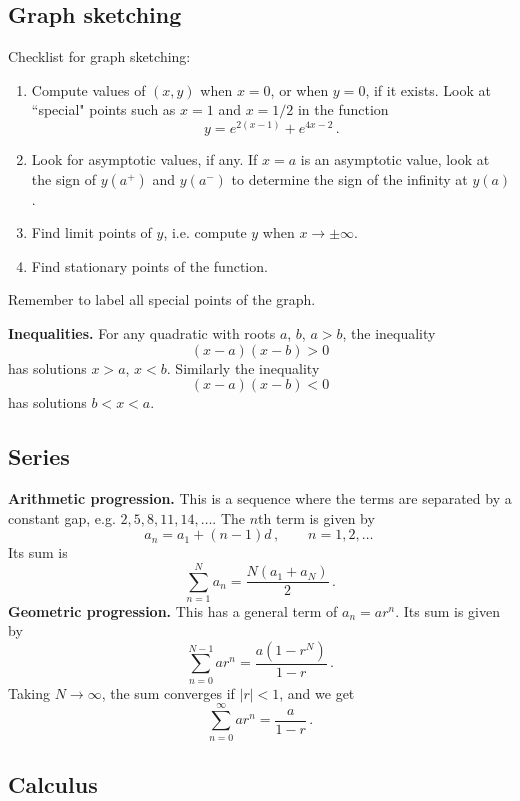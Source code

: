 \documentclass{article}
\begin{document}
\subsection{Graph sketching}
Checklist for graph sketching:
\begin{enumerate}
    \item Compute values of $(x,y)$ when $x=0$, or when $y=0$, if it exists. Look at ``special" points such as $x=1$ and $x=1/2$ in the function
    \[
    y=e^{2(x-1)} + e^{4x-2}\,.
    \]
    \item Look for asymptotic values, if any. If $x=a$ is an asymptotic value, look at the sign of $y(a^+)$ and $y(a^-)$ to determine the sign of the infinity at $y(a)$.
    \item Find limit points of $y$, i.e. compute $y$ when $x\rightarrow\pm\infty$.
    \item Find stationary points of the function.
\end{enumerate}
Remember to label all special points of the graph.

\textbf{Inequalities.} For any quadratic with roots $a$, $b$, $a > b$, the inequality
\[
(x-a)(x-b)>0
\]
has solutions $x>a$, $x<b$. Similarly the inequality
\[
(x-a)(x-b)<0
\]
has solutions $b<x<a$.

\subsection{Series}

\textbf{Arithmetic progression.} This is a sequence where the terms are separated by a constant gap, e.g. $2,5,8,11,14,\ldots$. The $n$th term is given by
\[
a_n = a_1 + (n-1)d\,,\qquad n=1,2,\ldots\,
\]
Its sum is
\[
\sum_{n=1}^N a_n = \frac{N(a_1+a_N)}{2}\,.
\]
\textbf{Geometric progression.} This has a general term of $a_n=a r^n$. Its sum is given by
\[
\sum_{n=0}^{N-1} ar^n = \frac{a(1-r^N)}{1-r}\,. 
\]
Taking $N\rightarrow\infty$, the sum converges if $|r|<1$, and we get
\[
\sum_{n=0}^\infty ar^n = \frac{a}{1-r}\,.
\]

\subsection{Calculus}
\end{document}
